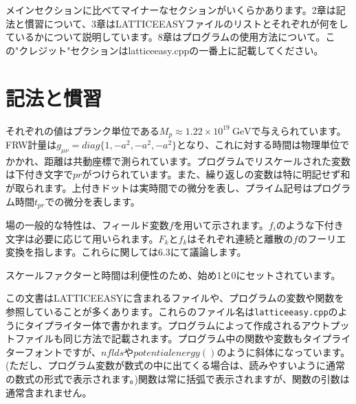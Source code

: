 \documentclass[dvipdfmx,11pt,a4paper,report]{jsbook}
\begin{document}
メインセクションに比べてマイナーなセクションがいくらかあります。2章は記法と慣習について、3章はLATTICEEASYファイルのリストとそれぞれが何をしているかについて説明しています。8章はプログラムの使用方法について。この"クレジット"セクションはlatticeeasy.cppの一番上に記載してください。

\chapter{記法と慣習}
それぞれの値はプランク単位である$M_p\approx 1.22\times 10^{19}\ \mathrm{GeV}$で与えられています。FRW計量は$g_{\mu \nu}=diag\{1,-a^2,-a^2,-a^2\}$となり、これに対する時間は物理単位でかかれ、距離は共動座標で測られています。プログラムでリスケールされた変数は下付き文字で$pr$がつけられています。また、繰り返しの変数は特に明記せず和が取られます。上付きドットは実時間での微分を表し、プライム記号はプログラム時間$t_{pr}$での微分を表します。

場の一般的な特性は、フィールド変数$f$を用いて示されます。$f_i$のような下付き文字は必要に応じて用いられます。$F_k$と$f_k$はそれぞれ連続と離散の$f$のフーリエ変換を指します。これらに関しては6.3にて議論します。

スケールファクターと時間は利便性のため、始め1と0にセットされています。

この文書はLATTICEEASYに含まれるファイルや、プログラムの変数や関数を参照していることが多くあります。これらのファイル名は{\tt latticeeasy.cpp}のようにタイプライター体で書かれます。プログラムによって作成されるアウトプットファイルも同じ方法で記載されます。プログラム中の関数や変数もタイプライターフォントですが、{\tt $nflds$}や{\tt $potentialenergy()$}のように斜体になっています。(ただし、プログラム変数が数式の中に出てくる場合は、読みやすいように通常の数式の形式で表示されます。)関数は常に括弧で表示されますが、関数の引数は通常含まれません。
\end{document}
